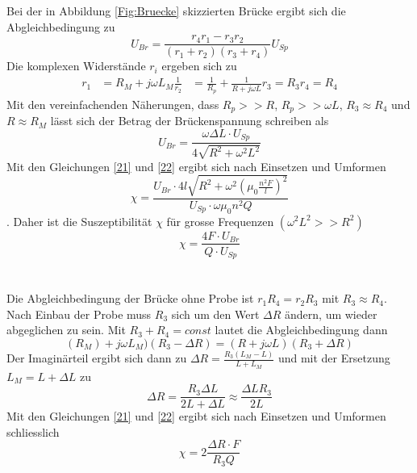 Bei der in Abbildung \ref{Fig:Bruecke} skizzierten Brücke ergibt sich die Abgleichbedingung zu 
\begin{equation*}
    U_{Br}=\frac{r_4r_1-r_3r_2}{(r_1+r_2)(r_3+r_4)}U_{Sp}
\end{equation*}
Die komplexen Widerstände $r_i$ ergeben sich zu 
\begin{align*}
    r_1&=R_M+j\omega L_M
    \frac{1}{r_2}&=\frac{1}{R_p}+\frac{1}{R+j\omega L}
    r_3=R_3
    r_4=R_4
\end{align*}
Mit den vereinfachenden Näherungen, dass $R_p>>R$, $R_p>>\omega L$, $R_3\approx R_4$ und $R\approx R_M$ lässt sich der Betrag der Brückenspannung schreiben als 
\begin{equation*}
    U_{Br}=\frac{\omega \Delta L\cdot U_{Sp}}{4\sqrt{R^2+\omega^2L^2}}
\end{equation*}
Mit den Gleichungen \ref{21} und \ref{22} ergibt sich nach Einsetzen und Umformen
\begin{equation*}
    \chi=\frac{U_{Br}\cdot 4l\sqrt{R^2+\omega^2(\mu_0\frac{n^2F}{l})^2}}{U_{Sp}\cdot\omega\mu_0n^2Q}
\end{equation*}.
Daher ist die Suszeptibilität $\chi$ für grosse Frequenzen $(\omega^2L^2>>R^2)$
\begin{equation*}
    \chi=\frac{4F\cdot U_{Br}}{Q\cdot U_{Sp}}
\end{equation*}\\\\
Die Abgleichbedingung der Brücke ohne Probe ist $r_1R_4=r_2R_3$ mit $R_3\approx R_4$. Nach Einbau der Probe muss $R_3$ sich um den Wert $\Delta R$ ändern, um wieder abgeglichen zu sein. Mit $R_3+R_4=const$ lautet die Abgleichbedingung dann 
\begin{equation*}
    (R_M)+j\omega L_M)(R_3-\Delta R)=(R+j\omega L)(R_3+\Delta R)
\end{equation*}
Der Imaginärteil ergibt sich dann zu $\Delta R=\frac{R_3(L_M-L)}{L+L_M}$ und mit der Ersetzung $L_M=L+\Delta L$ zu 
\begin{equation*}
    \Delta R=\frac{R_3\Delta L}{2L+\Delta L}\approx\frac{\Delta LR_3}{2L}
\end{equation*}
Mit den Gleichungen \ref{21} und \ref{22} ergibt sich nach Einsetzen und Umformen schliesslich
\begin{equation*}
    \chi=2\frac{\Delta R\cdot F}{R_3Q}
\end{equation*}
